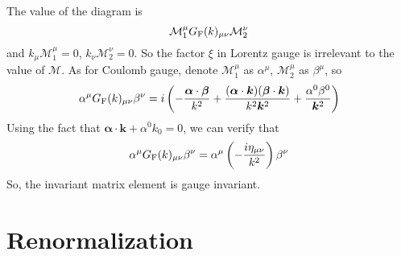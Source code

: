 \noindent
The value of the diagram is
\[\mathcal{M}_{1}^{\mu} G_{\rm F}(k)_{\mu\nu}\mathcal{M}_{2}^{\nu}\]
and $k_{\mu}\mathcal{M}_{1}^{\mu}=0$, $k_{\nu}\mathcal{M}_{2}^{\nu}=0$.
So the factor $\xi$ in Lorentz gauge is irrelevant to the value of $\mathcal{M}$. As for Coulomb gauge, denote $\mathcal{M}_{1}^{\mu}$ as $\alpha^{\mu}$, $\mathcal{M}_{2}^{\mu}$ as $\beta^{\mu}$, so 
\[\alpha^{\mu} G_{\rm F}(k)_{\mu\nu} \beta^{\nu} = i\left( -\frac{\bm{\alpha} \cdot \bm{\beta}}{k^2} + \frac{(\bm{\alpha}\cdot\bm{k})(\bm{\beta}\cdot\bm{k})}{k^2 \bm{k}^2} + \frac{\alpha^0 \beta^0 }{\bm{k}^2} \right)\]
Using the fact that $\bm{\alpha}\cdot\bm{k} + \alpha^0 k_0 = 0$, we can verify that
\[\alpha^{\mu} G_{\rm F}(k)_{\mu\nu} \beta^{\nu} = \alpha^{\mu} \left( -\frac{i\eta_{\mu\nu}}{k^2} \right)\beta^{\nu}\]
So, the invariant matrix element is gauge invariant.

\section{Renormalization}
